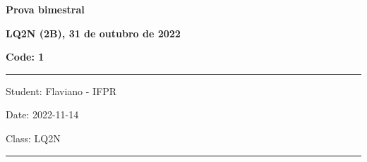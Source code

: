 \documentclass[12pt, addpoints]{exam}
\begin{document}
    \begin{minipage}[b]{0.75\linewidth}
        \begin{flushleft}
            {\bf \large Prova bimestral}
        \end{flushleft}
        \begin{flushleft}
            {\bf \large LQ2N (2B), 31 de outubro de 2022}
        \end{flushleft}
    \end{minipage}
    \begin{minipage}[b]{0.20\linewidth}
        \begin{flushright}
            {\bf \large Code: 1}
        \end{flushright}
    \end{minipage}
    \vspace{0.5cm} \hrule \vspace{0.5cm}
    \begin{minipage}{0.50\linewidth}
        \begin{flushleft}
            Student: Flaviano - IFPR
        \end{flushleft}
    \end{minipage}
    \begin{minipage}{0.20\linewidth}
        \begin{center}
            Date: 2022-11-14
        \end{center}
    \end{minipage}
    \begin{minipage}{0.20\linewidth}
        \begin{flushright}
            Class: LQ2N
        \end{flushright}
    \end{minipage}
    \vspace{0.5cm} \hrule \vspace{0.5cm}
\end{document}

